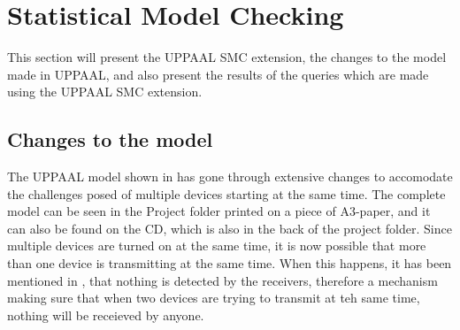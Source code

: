 \section{Statistical Model Checking}

This section will present the UPPAAL SMC extension, the changes to the model made in UPPAAL, and also present the results of the queries which are made using the UPPAAL SMC extension.



\subsection*{Changes to the model}

The UPPAAL model shown in  has gone through extensive changes to accomodate the challenges posed of multiple devices starting at the same time.
The complete model can be seen in the Project folder printed on a piece of A3-paper, and it can also be found on the CD, which is also in the back of the project folder.
Since multiple devices are turned on at the same time, it is now possible that more than one device is transmitting at the same time. 
When this happens, it has been mentioned in , that nothing is detected by the receivers, therefore a mechanism making sure that when two devices are trying to transmit at teh same time, nothing will be receieved by anyone.


